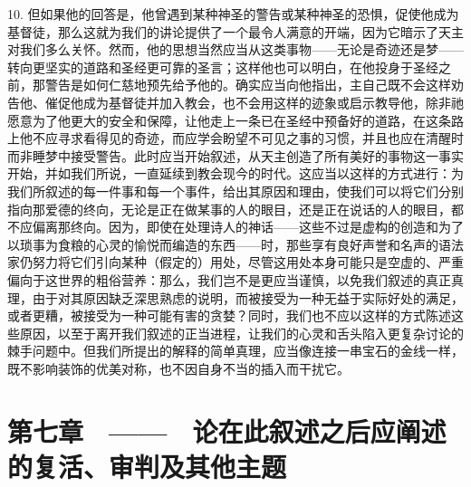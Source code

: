 10. 但如果他的回答是，他曾遇到某种神圣的警告或某种神圣的恐惧，促使他成为基督徒，那么这就为我们的讲论提供了一个最令人满意的开端，因为它暗示了天主对我们多么关怀。然而，他的思想当然应当从这类事物——无论是奇迹还是梦——转向更坚实的道路和圣经更可靠的圣言；这样他也可以明白，在他投身于圣经之前，那警告是如何仁慈地预先给予他的。确实应当向他指出，主自己既不会这样劝告他、催促他成为基督徒并加入教会，也不会用这样的迹象或启示教导他，除非祂愿意为了他更大的安全和保障，让他走上一条已在圣经中预备好的道路，在这条路上他不应寻求看得见的奇迹，而应学会盼望不可见之事的习惯，并且也应在清醒时而非睡梦中接受警告。此时应当开始叙述，从天主创造了所有美好的事物这一事实开始，并如我们所说，一直延续到教会现今的时代。这应当以这样的方式进行：为我们所叙述的每一件事和每一个事件，给出其原因和理由，使我们可以将它们分别指向那爱德的终向，无论是正在做某事的人的眼目，还是正在说话的人的眼目，都不应偏离那终向。因为，即使在处理诗人的神话——这些不过是虚构的创造和为了以琐事为食粮的心灵的愉悦而编造的东西——时，那些享有良好声誉和名声的语法家仍努力将它们引向某种（假定的）用处，尽管这用处本身可能只是空虚的、严重偏向于这世界的粗俗营养：那么，我们岂不是更应当谨慎，以免我们叙述的真正真理，由于对其原因缺乏深思熟虑的说明，而被接受为一种无益于实际好处的满足，或者更糟，被接受为一种可能有害的贪婪？同时，我们也不应以这样的方式陈述这些原因，以至于离开我们叙述的正当进程，让我们的心灵和舌头陷入更复杂讨论的棘手问题中。但我们所提出的解释的简单真理，应当像连接一串宝石的金线一样，既不影响装饰的优美对称，也不因自身不当的插入而干扰它。\par


\section{第七章　——　论在此叙述之后应阐述的复活、审判及其他主题}

